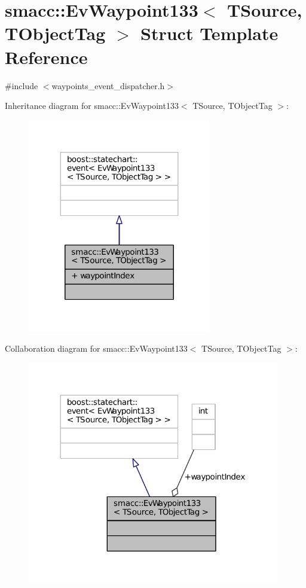 \hypertarget{structsmacc_1_1EvWaypoint133}{}\section{smacc\+:\+:Ev\+Waypoint133$<$ T\+Source, T\+Object\+Tag $>$ Struct Template Reference}
\label{structsmacc_1_1EvWaypoint133}


{\ttfamily \#include $<$waypoints\+\_\+event\+\_\+dispatcher.\+h$>$}



Inheritance diagram for smacc\+:\+:Ev\+Waypoint133$<$ T\+Source, T\+Object\+Tag $>$\+:
\nopagebreak
\begin{figure}[H]
\begin{center}
\leavevmode
\includegraphics[width=227pt]{structsmacc_1_1EvWaypoint133__inherit__graph}
\end{center}
\end{figure}


Collaboration diagram for smacc\+:\+:Ev\+Waypoint133$<$ T\+Source, T\+Object\+Tag $>$\+:
\nopagebreak
\begin{figure}[H]
\begin{center}
\leavevmode
\includegraphics[width=312pt]{structsmacc_1_1EvWaypoint133__coll__graph}
\end{center}
\end{figure}

